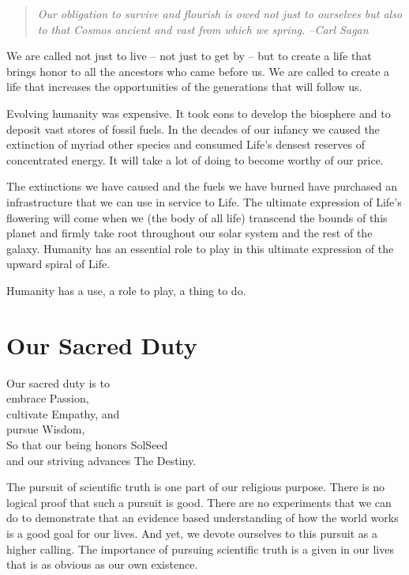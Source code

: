 \documentclass[ebook,12pt,openany,twoside]{memoir}
\newcommand{\tab}{\hspace*{2em}}
\newcommand{\imagefacingchapter}[1]{
  \cleartoverso
  \clearpage \null
  \thispagestyle{cleared}
  \AddToShipoutPictureBG*{%
    \AtStockLowerLeft{%
      \texttt{[image: \#1]}
    }
  }
  \clearpage
}
\begin{document}
\begin{quote}
\em
Our obligation to survive and flourish is owed not just to ourselves but also
to that Cosmos ancient and vast from which we spring. --Carl Sagan
\end{quote}

We are called not just to live -- not just to get by -- but to create a life
that brings honor to all the ancestors who came before us. We are called to
create a life that increases the opportunities of the generations that will
follow us.

Evolving humanity was expensive. It took eons to develop the biosphere and to
deposit vast stores of fossil fuels. In the decades of our infancy we caused
the extinction of myriad other species and consumed Life's densest reserves of
concentrated energy. It will take a lot of doing to become worthy of our price.


The extinctions we have caused and the fuels we have burned have purchased an
infrastructure that we can use in service to Life. The ultimate expression of
Life's flowering will come when we (the body of all life) transcend the bounds
of this planet and firmly take root throughout our solar system and the rest of
the galaxy. Humanity has an essential role to play in this ultimate expression
of the upward spiral of Life.

Humanity has a use, a role to play, a thing to do.

\imagefacingchapter{images/StainedGlass}
\chapter{Our Sacred Duty}
\setlength\epigraphwidth{3.0in}
\epigraph{
  Our sacred duty is to\\
  embrace Passion,\\
  cultivate Empathy, and\\
  pursue Wisdom,\\
  \tab So that our being honors SolSeed\\
  \tab and our striving advances The Destiny.
}{}

\noindent The pursuit of scientific truth is one part of our religious purpose.
There is no logical proof that such a pursuit is good. There are no experiments
that we can do to demonstrate that an evidence based understanding of how the
world works is a good goal for our lives. And yet, we devote ourselves to this
pursuit as a higher calling. The importance of pursuing scientific truth is a
given in our lives that is as obvious as our own existence.
\end{document}
